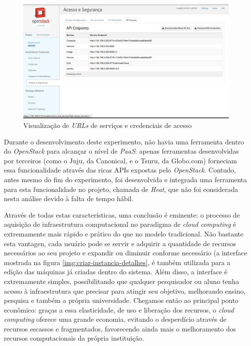 \begin{figure}[h]
  \center
  \includegraphics[scale=0.3]{imagem/acesso-e-seguranca-acesso-api.png}
  \caption{Visualização de \emph{URLs} de serviços e credenciais de acesso}
  \label{img:acesso-e-seguranca-acesso-api}
\end{figure}

Durante o desenvolvimento deste experimento, não havia uma ferramenta dentro do
\emph{OpenStack} para alcançar o nível de \emph{PaaS}: apenas ferramentas
desenvolvidas por terceiros (como o Juju, da Canonical, e o Tsuru, da Globo.com)
forneciam essa funcionalidade através das ricas APIs expostas pelo \emph{OpenStack}.
Contudo, antes mesmo do fim do experimento, foi desenvolvida e integrada uma
ferramenta para esta funcionalidade no projeto, chamada de \emph{Heat}, que não
foi considerada nesta análise devido à falta de tempo hábil.

Através de todas estas características, uma conclusão é eminente: o processo
de aquisição de infraestrutura computacional no paradigma de \emph{cloud computing}
é extremamente mais rápido e prático do que no modelo tradicional. Não bastante
esta vantagen, cada usuário pode se servir e adquirir a quantidade de recursos
necessários ao seu projeto e expandir ou diminuir conforme necessário (a interface
mostrada na figura \ref{img:criar-instancia-detalhes}, é também utilizada para a
edição das máquinas já criadas dentro do sistema. Além disso,
a interface é extremamente simples, possibilitando que qualquer pesquisador ou aluno
tenha acesso à infraestrutura que precisar para atingir seu objetivo, melhorando
ensino, pesquisa e também a própria universidade. Chegamos
então ao principal ponto econômico: graças a essa elasticidade, de uso e liberação
dos recursos, o \emph{cloud computing} oferece uma grande economia, evitando
o desperdício através de recursos escassos e fragmentados, favorecendo
ainda mais o melhoramento dos recursos computacionais da própria instituição.


